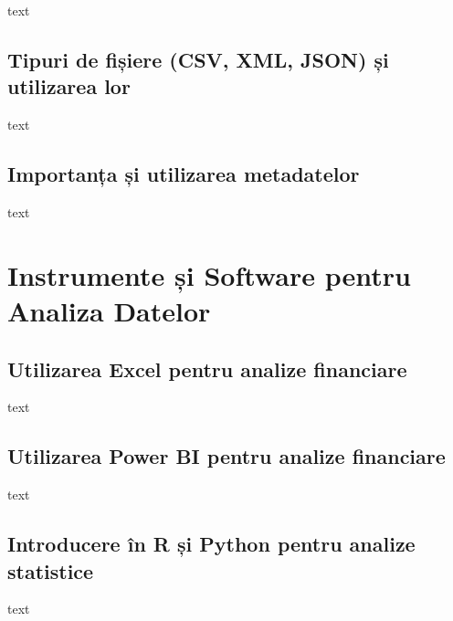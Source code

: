 \documentclass[
  11pt,
  b5paper,
  nottoc]{book}
\begin{document}
text

\hypertarget{tipuri-de-fiux219iere-csv-xml-json-ux219i-utilizarea-lor-6}{%
\subsection{Tipuri de fișiere (CSV, XML, JSON) și utilizarea
lor}\label{tipuri-de-fiux219iere-csv-xml-json-ux219i-utilizarea-lor-6}}

text

\hypertarget{importanux21ba-ux219i-utilizarea-metadatelor-6}{%
\subsection{Importanța și utilizarea
metadatelor}\label{importanux21ba-ux219i-utilizarea-metadatelor-6}}

text

\hypertarget{instrumente-ux219i-software-pentru-analiza-datelor-6}{%
\section{Instrumente și Software pentru Analiza
Datelor}\label{instrumente-ux219i-software-pentru-analiza-datelor-6}}

\hypertarget{utilizarea-excel-pentru-analize-financiare-6}{%
\subsection{Utilizarea Excel pentru analize
financiare}\label{utilizarea-excel-pentru-analize-financiare-6}}

text

\hypertarget{utilizarea-power-bi-pentru-analize-financiare-6}{%
\subsection{Utilizarea Power BI pentru analize
financiare}\label{utilizarea-power-bi-pentru-analize-financiare-6}}

text

\hypertarget{introducere-uxeen-r-ux219i-python-pentru-analize-statistice-6}{%
\subsection{Introducere în R și Python pentru analize
statistice}\label{introducere-uxeen-r-ux219i-python-pentru-analize-statistice-6}}

text
\end{document}

